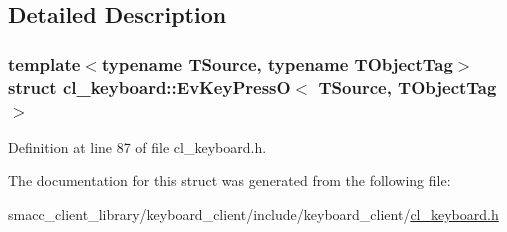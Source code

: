 \subsection{Detailed Description}
\subsubsection*{template$<$typename T\+Source, typename T\+Object\+Tag$>$\newline
struct cl\+\_\+keyboard\+::\+Ev\+Key\+Press\+O$<$ T\+Source, T\+Object\+Tag $>$}



Definition at line 87 of file cl\+\_\+keyboard.\+h.



The documentation for this struct was generated from the following file\+:\begin{DoxyCompactItemize}
\item 
smacc\+\_\+client\+\_\+library/keyboard\+\_\+client/include/keyboard\+\_\+client/\hyperlink{cl__keyboard_8h}{cl\+\_\+keyboard.\+h}\end{DoxyCompactItemize}
